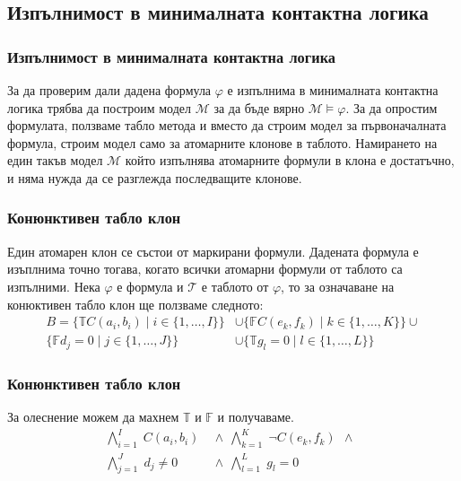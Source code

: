 \documentclass{beamer}
\newcommand{\signT}{\mathbb{T}}
\newcommand{\signF}{\mathbb{F}}
\begin{document}
\subsection{Изпълнимост в минималната контактна логика}
\begin{frame}\frametitle{Изпълнимост в минималната контактна логика}
За да проверим дали дадена формула $\varphi$ е изпълнима в минималната контактна логика трябва да построим модел $\mathcal{M}$
за да бъде вярно $\mathcal{M} \models \varphi$.
\newline
\newline
За да опростим формулата, ползваме табло метода и вместо да строим модел за първоначалната формула, строим модел само за 
атомарните клонове в таблото.
\newline
Намирането на един такъв модел $\mathcal{M}$ който изпълнява атомарните формули в клона е достатъчно, и няма нужда да се разглежда последващите клонове.
\end{frame}

\begin{frame}\frametitle{Конюнктивен табло клон}
Един атомарен клон се състои от маркирани формули. Дадената формула е изъплнима точно тогава, когато всички атомарни формули от таблото са изпълними.
\newline
\newline
		Нека $\varphi$ е формула и $\mathcal{T}$ е таблото от $\varphi$, то за означаване на конюктивен табло клон ще ползваме следното:
		\begin{align*}
				B = \{\signT C(a_i, b_i) \mid i \in \{1, \ldots, I\} \} &\cup 
					\{\signF C(e_k, f_k) \mid k \in \{1, \ldots, K\} \} \cup \\
					\{\signF d_j = 0 \mid j \in \{1, \ldots, J\} \} &\cup 
					\{\signT g_l = 0 \mid l \in \{1, \ldots, L\} \}
		\end{align*}
\end{frame}

\begin{frame}\frametitle{Конюнктивен табло клон}
		За олеснение можем да махнем $\signT \textit{ и } \signF$ и получаваме.
\begin{align*}
			\bigwedge_{i=1}^{I} \; C(a_i, b_i) \:\: & \wedge \:\: 
			\bigwedge_{k=1}^{K} \; \neg C(e_k, f_k) \:\: \wedge \:\: \\
			\bigwedge_{j=1}^{J} \; d_j \neq 0 \:\: & \wedge \:\:
			\bigwedge_{l=1}^{L} \; g_l = 0 \:\:
\end{align*}%
\end{frame}
\end{document}
